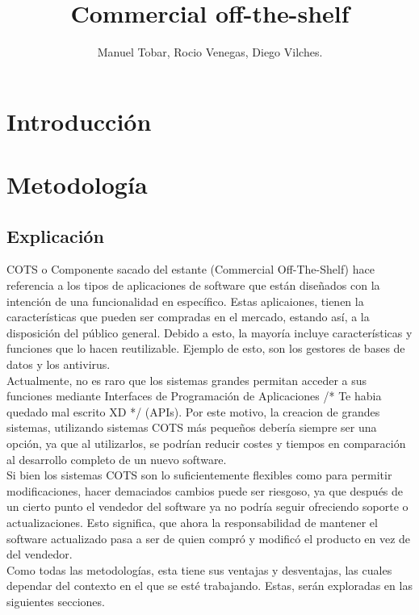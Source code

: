 \documentclass{udpreport}
\title{Commercial off-the-shelf}
\author{Manuel Tobar, Rocio Venegas, Diego Vilches.}
\begin{document}
\maketitle
\tableofcontents
\chapter{Introducción}

\chapter{Metodología}
	\section{Explicación}
	COTS o Componente sacado del estante (Commercial Off-The-Shelf) hace referencia a los tipos de aplicaciones de software que están diseñados con la intención de una funcionalidad en específico. Estas aplicaiones, tienen la características que pueden ser compradas en el mercado, estando así, a la disposición del público general. Debido a esto, la mayoría incluye características y funciones que lo hacen reutilizable. Ejemplo de esto, son los gestores de bases de datos y los antivirus.
	\\
	
	
	Actualmente, no es raro que los sistemas grandes permitan acceder a sus funciones mediante Interfaces de Programación de Aplicaciones /* Te habia quedado mal escrito XD */ (APIs). Por este motivo, la creacion de grandes sistemas, utilizando sistemas COTS más pequeños debería siempre ser una opción, ya que al utilizarlos, se podrían reducir costes y tiempos en comparación al desarrollo completo de un nuevo software.
	\\
	
	
	Si bien los sistemas COTS son lo suficientemente flexibles como para permitir modificaciones, hacer demaciados cambios puede ser riesgoso, ya que después de un cierto punto el vendedor del software ya no podría seguir ofreciendo soporte o actualizaciones. Esto significa, que ahora la responsabilidad de mantener el software actualizado pasa a ser de quien compró y modificó el producto en vez de del vendedor.
	\\	
	
	
	Como todas las metodologías, esta tiene sus ventajas y desventajas, las cuales dependar del contexto en el que se esté trabajando. Estas, serán exploradas en las siguientes secciones.
\end{document}
